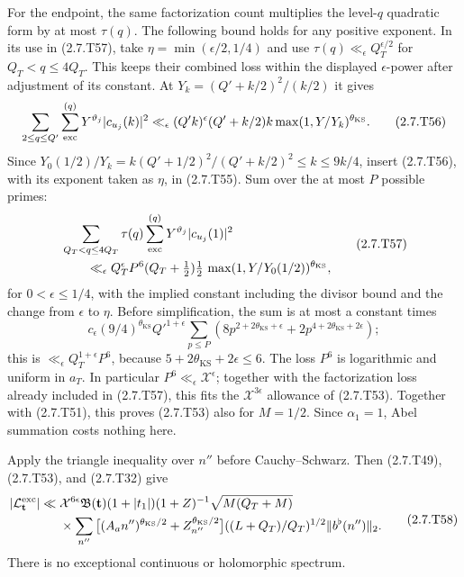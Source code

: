 For the endpoint, the same factorization count multiplies the
level-$q$ quadratic form by at most $\tau(q)$. The following bound
holds for any positive exponent. In its use in (2.7.T57), take
$\eta=\min(\epsilon/2,1/4)$ and use
$\tau(q)\ll_\epsilon Q_T^{\epsilon/2}$ for
$Q_T<q\le4Q_T$. This keeps their combined loss within the
displayed $\epsilon$-power after adjustment of its constant. At
$Y_k=(Q'+k/2)^2/(k/2)$ it gives
\[
\sum_{2\le q\le Q'}\sum_{\rm exc}^{(q)}
 Y^{\vartheta_j}|c_{u_j}(k)|^2
 \ll_\epsilon (Q'k)^\epsilon(Q'+k/2)k
                          \max(1,Y/Y_k)^{\theta_{\mathrm{KS}}}.
\tag{2.7.T56}\label{p1:eq:2.7.T56}
\]
Since $Y_0(1/2)/Y_k=k(Q'+1/2)^2/(Q'+k/2)^2\le k\le9k/4$, insert (2.7.T56), with its
exponent taken as $\eta$, in (2.7.T55).
Sum over the at most $P$ possible primes:
\[
\begin{aligned}
&\sum_{Q_T<q\le4Q_T}\tau(q)\sum_{\rm exc}^{(q)}
 Y^{\vartheta_j}|c_{u_j}(1)|^2\\
&\qquad\ll_\epsilon Q_T^\epsilon P^6
 (Q_T+\tfrac12)\tfrac12\,
 \max(1,Y/Y_0(1/2))^{\theta_{\mathrm{KS}}},
\end{aligned}
\tag{2.7.T57}\label{p1:eq:2.7.T57}
\]
for $0<\epsilon\le1/4$, with the implied constant including
the divisor bound and the change from $\epsilon$ to $\eta$.
Before simplification, the sum is at most a constant times
\[
c_\epsilon(9/4)^{\theta_{\mathrm{KS}}} Q'^{1+\epsilon}
 \sum_{p\le P}(8p^{2+2\theta_{\mathrm{KS}}+\epsilon}
                         +2p^{4+2\theta_{\mathrm{KS}}+2\epsilon});
\]
this is $\ll_\epsilon Q_T^{1+\epsilon}P^6$, because
$5+2\theta_{\mathrm{KS}}+2\epsilon\le6$.
The loss $P^6$ is logarithmic and uniform in $a_T$.
In particular $P^6\ll_\epsilon\mathcal X^\epsilon$; together
with the factorization loss already included in (2.7.T57), this
fits the $\mathcal X^{3\epsilon}$ allowance of (2.7.T53).
Together with (2.7.T51), this proves (2.7.T53) also for $M=1/2$.
Since $\alpha_1=1$, Abel summation costs nothing here.

Apply the triangle inequality over $n''$ before Cauchy--Schwarz.
Then (2.7.T49), (2.7.T53), and (2.7.T32) give
\[
\begin{aligned}
|\mathcal L_{\mathbf t}^{\rm exc}|
\ll{}&\mathcal X^{6\epsilon}\mathfrak B(\mathbf t)(1+|t_1|)
 (1+Z)^{-1}\sqrt{M(Q_T+M)}\\
&\times\sum_{n''}\big[(A_an'')^{\theta_{\mathrm{KS}}/2}
                 +Z_{n''}^{\theta_{\mathrm{KS}}/2}\big]
        ((L+Q_T)/Q_T)^{1/2}\|b^\flat(n'')\|_2.
\end{aligned}
\tag{2.7.T58}\label{p1:eq:2.7.T58}
\]
There is no exceptional continuous or holomorphic spectrum.

